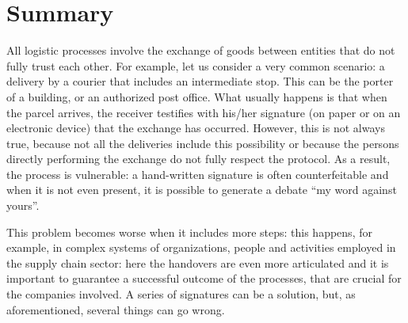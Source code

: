 \chapter*{Summary} %
\label{abstract}


\iffalse



  Sommario è un breve riassunto del lavoro svolto dove si descrive l'obiettivo, l'oggetto della tesi, le 
metodologie e le tecniche usate, i dati elaborati e la spiegazione delle conclusioni alle quali siete arrivati.  

Il sommario dell’elaborato consiste al massimo di 3 pagine e deve contenere le seguenti informazioni:
\begin{itemize}
  \item contesto e motivazioni 
  \item breve riassunto del problema affrontato
  \item tecniche utilizzate e/o sviluppate
  \item risultati raggiunti, sottolineando il contributo personale del laureando/a
\end{itemize}

\fi

All logistic processes involve the exchange of goods between entities that do not fully trust each other. For example, let us consider a very common scenario: a delivery by a courier that includes an intermediate stop. This can be the porter of a building, or an authorized post office. What usually happens is that when the parcel arrives, the receiver testifies with his/her signature (on paper or on an electronic device) that the exchange has occurred. However, this is not always true, because not all the deliveries include this possibility or because the persons directly performing the exchange do not fully respect the protocol. As a result, the process is vulnerable: a hand-written signature is often counterfeitable and when it is not even present, it is possible to generate a debate ``my word against yours''.

This problem becomes worse when it includes more steps: this happens, for example, in complex systems of organizations, people and activities employed in the supply chain sector: here the handovers are even more articulated and it is important to guarantee a successful outcome of the processes, that are crucial for the companies involved. A series of signatures can be a solution, but, as aforementioned, several things can go wrong.

